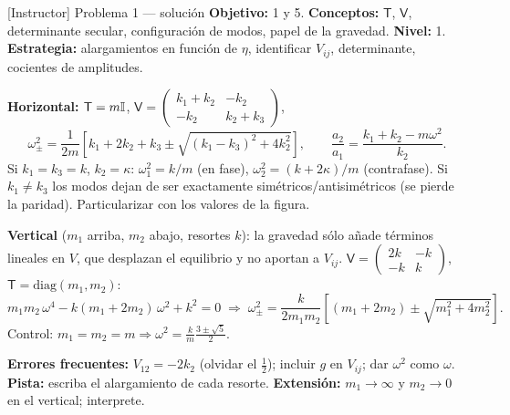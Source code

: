 \documentclass[spanish,10pt]{beamer}
\newcommand{\Tm}{\mathsf{T}}                 %
\newcommand{\Vm}{\mathsf{V}}                 %
\begin{document}
\begin{frame}{[Instructor] Problema 1 — solución}
\footnotesize
\textbf{Objetivo:} 1 y 5. \textbf{Conceptos:} $\Tm$, $\Vm$, determinante secular, configuración de modos, papel de la gravedad. \textbf{Nivel:} 1. \textbf{Estrategia:} alargamientos en función de $\eta$, identificar $V_{ij}$, determinante, cocientes de amplitudes.

\textbf{Horizontal:} $\Tm=m\Id$, $\Vm=\begin{pmatrix}k_1+k_2&-k_2\\-k_2&k_2+k_3\end{pmatrix}$,
\[
\omega_\pm^2=\frac{1}{2m}\left[k_1+2k_2+k_3\pm\sqrt{(k_1-k_3)^2+4k_2^2}\right],\qquad
\frac{a_2}{a_1}=\frac{k_1+k_2-m\omega^2}{k_2}.
\]
Si $k_1=k_3=k$, $k_2=\kappa$: $\omega_1^2=k/m$ (en fase), $\omega_2^2=(k+2\kappa)/m$ (contrafase). Si $k_1\neq k_3$ los modos dejan de ser exactamente simétricos/antisimétricos (se pierde la paridad). Particularizar con los valores de la figura.

\textbf{Vertical} ($m_1$ arriba, $m_2$ abajo, resortes $k$): la gravedad sólo añade términos lineales en $V$, que desplazan el equilibrio y no aportan a $V_{ij}$.
$\Vm=\begin{pmatrix}2k&-k\\-k&k\end{pmatrix}$, $\Tm=\mathrm{diag}(m_1,m_2)$:
\[
m_1m_2\,\omega^4-k(m_1+2m_2)\,\omega^2+k^2=0\;\Rightarrow\;
\omega_\pm^2=\frac{k}{2m_1m_2}\left[(m_1+2m_2)\pm\sqrt{m_1^2+4m_2^2}\right].
\]
Control: $m_1=m_2=m\Rightarrow\omega^2=\frac km\frac{3\pm\sqrt5}{2}$.

\textbf{Errores frecuentes:} $V_{12}=-2k_2$ (olvidar el $\frac12$); incluir $g$ en $V_{ij}$; dar $\omega^2$ como $\omega$. \textbf{Pista:} escriba el alargamiento de cada resorte. \textbf{Extensión:} $m_1\to\infty$ y $m_2\to0$ en el vertical; interprete.
\end{frame}
\end{document}
